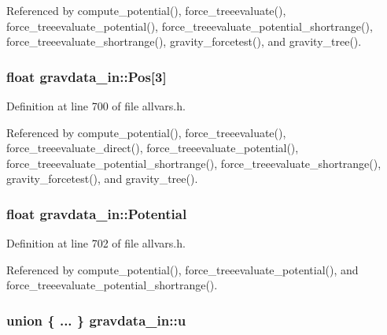 Referenced by compute\_\-potential(), force\_\-treeevaluate(), force\_\-treeevaluate\_\-potential(), force\_\-treeevaluate\_\-potential\_\-shortrange(), force\_\-treeevaluate\_\-shortrange(), gravity\_\-forcetest(), and gravity\_\-tree().

\hypertarget{structgravdata__in_a8cac0f094027f8638152ecdcf11f1e92}{
\subsubsection[{Pos}]{\setlength{\rightskip}{0pt plus 5cm}float {\bf gravdata\_\-in::Pos}\mbox{[}3\mbox{]}}}
\label{structgravdata__in_a8cac0f094027f8638152ecdcf11f1e92}


Definition at line 700 of file allvars.h.



Referenced by compute\_\-potential(), force\_\-treeevaluate(), force\_\-treeevaluate\_\-direct(), force\_\-treeevaluate\_\-potential(), force\_\-treeevaluate\_\-potential\_\-shortrange(), force\_\-treeevaluate\_\-shortrange(), gravity\_\-forcetest(), and gravity\_\-tree().

\hypertarget{structgravdata__in_ac003758a6c6e72bb9cc1ce619fabf148}{
\subsubsection[{Potential}]{\setlength{\rightskip}{0pt plus 5cm}float {\bf gravdata\_\-in::Potential}}}
\label{structgravdata__in_ac003758a6c6e72bb9cc1ce619fabf148}


Definition at line 702 of file allvars.h.



Referenced by compute\_\-potential(), force\_\-treeevaluate\_\-potential(), and force\_\-treeevaluate\_\-potential\_\-shortrange().

\hypertarget{structgravdata__in_a89df6fdf4fb1512fa2b491eb4fb10662}{
\subsubsection[{u}]{\setlength{\rightskip}{0pt plus 5cm}union \{ ... \} 
   {\bf gravdata\_\-in::u}}}
\label{structgravdata__in_a89df6fdf4fb1512fa2b491eb4fb10662}



